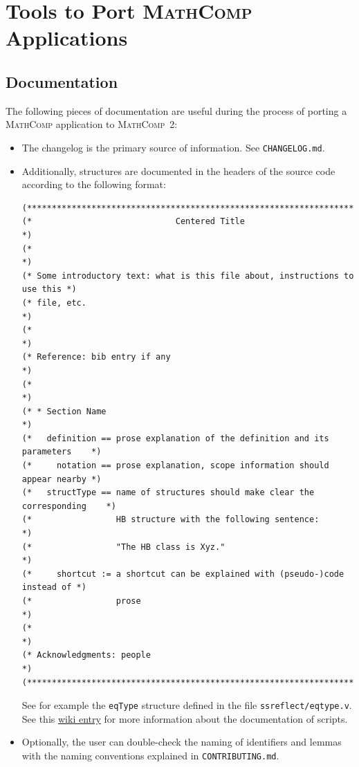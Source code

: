 \documentclass{article}
\def\mathcomp{\textsc{MathComp}}
\def\mathcomptwo{\mathcomp~2}
\def\coqin#1{\texttt{#1}}
\begin{document}
\section{Tools to Port \mathcomp{} Applications}
\label{sec:explore}

\subsection{Documentation}

The following pieces of documentation are useful during the process of
porting a \mathcomp{} application to \mathcomptwo:
\begin{itemize}
\item The changelog is the primary source of information. See \coqin{CHANGELOG.md}.
\item Additionally, structures are documented in the headers of the
  source code according to the following format:
\begin{verbatim}
(*****************************************************************************)
(*                             Centered Title                                *)
(*                                                                           *)
(* Some introductory text: what is this file about, instructions to use this *)
(* file, etc.                                                                *)
(*                                                                           *)
(* Reference: bib entry if any                                               *)
(*                                                                           *)
(* * Section Name                                                            *)
(*   definition == prose explanation of the definition and its parameters    *)
(*     notation == prose explanation, scope information should appear nearby *)
(*   structType == name of structures should make clear the corresponding    *)
(*                 HB structure with the following sentence:                 *) 
(*                 "The HB class is Xyz."                                    *)
(*     shortcut := a shortcut can be explained with (pseudo-)code instead of *)
(*                 prose                                                     *)
(*                                                                           *)
(* Acknowledgments: people                                                   *)
(*****************************************************************************)    
\end{verbatim}
See for example the \coqin{eqType} structure defined in the file
\coqin{ssreflect/eqtype.v}.
%
See this
\href{https://github.com/math-comp/math-comp/wiki/How-to-document}{wiki
  entry} for more information about the documentation of scripts.
\item Optionally, the user can double-check the naming of identifiers
  and lemmas with the naming conventions explained in
  \coqin{CONTRIBUTING.md}.
\end{itemize}
\end{document}

